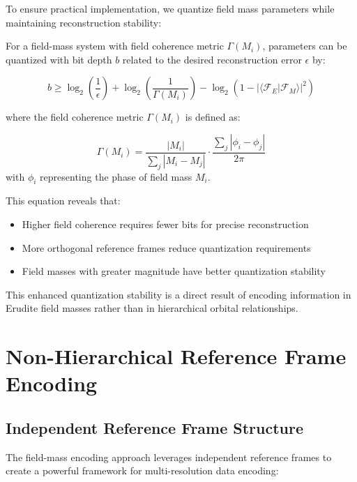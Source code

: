 To ensure practical implementation, we quantize field mass parameters while maintaining reconstruction stability:

\begin{proposition}
For a field-mass system with field coherence metric $\Gamma(M_i)$, parameters can be quantized with bit depth $b$ related to the desired reconstruction error $\epsilon$ by:

\begin{equation}
b \geq \log_2\left(\frac{1}{\epsilon}\right) + \log_2\left(\frac{1}{\Gamma(M_i)}\right) - \log_2\left(1 - |\langle \mathcal{F}_E|\mathcal{F}_M \rangle|^2\right)
\end{equation}

where the field coherence metric $\Gamma(M_i)$ is defined as:

\begin{equation}
\Gamma(M_i) = \frac{|M_i|}{\sum_j |M_i - M_j|} \cdot \frac{\sum_j |\phi_i - \phi_j|}{2\pi}
\end{equation}
with $\phi_i$ representing the phase of field mass $M_i$.
\end{proposition}

This equation reveals that:
\begin{itemize}
    \item Higher field coherence requires fewer bits for precise reconstruction
    \item More orthogonal reference frames reduce quantization requirements
    \item Field masses with greater magnitude have better quantization stability
\end{itemize}

This enhanced quantization stability is a direct result of encoding information in Erudite field masses rather than in hierarchical orbital relationships.

\section{Non-Hierarchical Reference Frame Encoding}

\subsection{Independent Reference Frame Structure}

The field-mass encoding approach leverages independent reference frames to create a powerful framework for multi-resolution data encoding:

